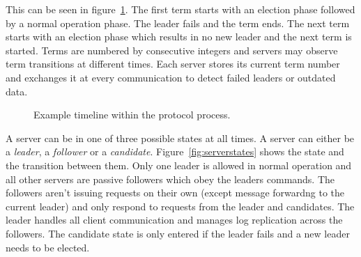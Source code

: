 This can be seen in figure~\ref{fig:terms}. The first term starts with an
election phase followed by a normal operation phase. The leader fails and
the term ends. The next term starts with an election phase which results in no
new leader and the next term is started.
Terms are numbered by consecutive integers and servers may observe term
transitions at different times. Each server stores its current term number
and exchanges it at every communication to detect failed leaders or outdated
data.~\cite{ongaro2014search}

\begin{figure}[ht]
  \centering
  \caption{Example timeline within the protocol process.}
  \label{fig:terms}
\end{figure}

A server can be in one of three possible states at all times.
A server can either be a \textit{leader}, a \textit{follower} or a
\textit{candidate}. Figure~\ref{fig:serverstates} shows the state
and the transition between them. Only one leader is allowed in normal operation
and all other servers are passive followers which obey the leaders commands.
The followers aren't issuing requests on their own (except message forwardng to
the current leader) and only respond to requests from the leader and candidates.
The leader handles all client communication and manages log replication across
the followers. The candidate state is only entered if the leader fails and
a new leader needs to be elected.~\cite{ongaro2014search}

